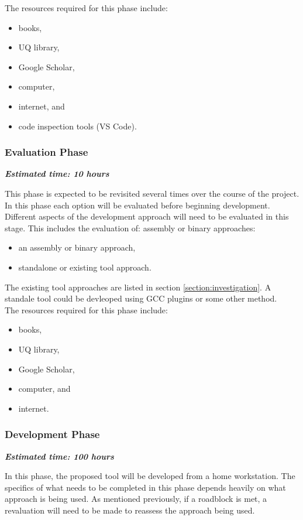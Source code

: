 \documentclass[twocolumn]{article}
\begin{document}
The resources required for this phase include:
\begin{itemize}
    \item books,
    \item UQ library,
    \item Google Scholar,
    \item computer,
    \item internet, and
    \item code inspection tools (VS Code).
\end{itemize}

\subsubsection{Evaluation Phase}
\textbf{\textit{Estimated time: 10 hours}}

This phase is expected to be revisited several times over the course of the project. In this phase each option will be evaluated before beginning development. Different aspects of the development approach will need to be evaluated in this stage. This includes the evaluation of: assembly or binary approaches:

\begin{itemize}
    \item an assembly or binary approach,
    \item standalone or existing tool approach. 
\end{itemize}

The existing tool approaches are listed in section \ref{section:investigation}. A standale tool could be devleoped using GCC plugins or some other method.\\

The resources required for this phase include:
\begin{itemize}
    \item books,
    \item UQ library,
    \item Google Scholar,
    \item computer, and
    \item internet.
\end{itemize}

\subsubsection{Development Phase}
\textbf{\textit{Estimated time: 100 hours}}

In this phase, the proposed tool will be developed from a home workstation. 
The specifics of what needs to be completed in this phase depends heavily on what approach is being used. As mentioned previously, if a roadblock is met, a revaluation will need to be made to reassess the approach being used. \\
\end{document}
